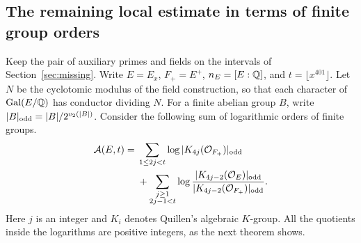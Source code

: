 \documentclass[a4paper,11pt]{article}
\theoremstyle{definition}
\theoremstyle{remark}
\numberwithin{equation}{section}
\begin{document}
\subsection{The remaining local estimate in terms of finite group orders}\label{nav:II-27}
Keep the pair of auxiliary primes and fields on the intervals of
Section~\ref{sec:missing}. Write \(E=E_x\), \(F_+=E^+\),
\(n_E=[E:\mathbb Q]\), and \(t=\lfloor x^{401}\rfloor\). Let \(N\) be
the cyclotomic modulus of the field construction, so that each
character of \(\operatorname{Gal}(E/\mathbb Q)\) has conductor dividing \(N\).
For a finite abelian group \(B\), write
\(|B|_{\rm odd}=|B|/2^{v_2(|B|)}\).
Consider the following sum of logarithmic orders of finite groups.
\begin{equation}
\begin{split}
 {\cal A}(E,t)
  ={}&\sum_{1\le 2j<t}\log |K_{4j}(\mathcal O_{F_+})|_{\rm odd}\\
     &+\sum_{\substack{j\ge1\\2j-1<t}}
        \log \frac{|K_{4j-2}(\mathcal O_E)|_{\rm odd}}
                       {|K_{4j-2}(\mathcal O_{F_+})|_{\rm odd}} .
\end{split}                                                    \label{eq:A100}
\end{equation}
Here \(j\) is an integer and \(K_i\) denotes Quillen's algebraic
\(K\)-group. All the quotients inside the logarithms are positive
integers, as the next theorem shows.
\end{document}
